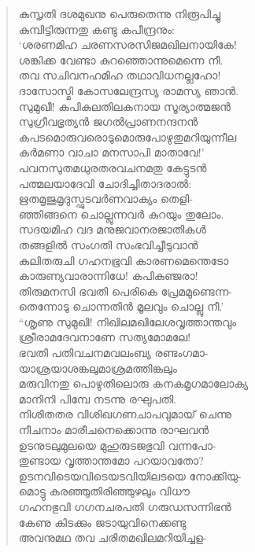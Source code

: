 \begin{verse}
കുസൃതി ദശമുഖനു പെരുതെന്നു നിരൂപിച്ചു\\
കുമ്പിട്ടിരുന്നതു കണ്ടു കപീന്ദ്രനും:\\
‘ശരണമിഹ ചരണസരസിജമഖിലനായികേ!\\
ശങ്കിക്ക വേണ്ടാ കുറഞ്ഞൊന്നുമെന്നെ നീ.\\
തവ സചിവനഹമിഹ തഥാവിധനല്ലഹോ!\\
ദാസോസ്മി കോസലേന്ദ്രസ്യ രാമസ്യ ഞാന്‍.\\
സുമുഖീ! കപികുലതിലകനായ സൂര്യാത്മജന്‍\\
സുഗ്രീവഭൃത്യന്‍ ജഗല്‍പ്രാണനന്ദനന്‍\\
കപടമൊരുവരൊടുമൊരുപോഴുതുമറിയുന്നീല\\
കര്‍മണാ വാചാ മനസാപി മാതാവേ!’\\
പവനസുതമധുരതരവചനമതു കേട്ടുടന്‍\\
പത്മലയാദേവി ചോദിച്ചിതാദരാല്‍:\\
ഋതമൃജുമൃദുസ്ഫുടവര്‍ണവാക്യം തെളി-\\
ഞ്ഞിങ്ങനെ ചൊല്ലുന്നവര്‍ കുറയും തുലോം.\\
സദയമിഹ വദ മനുജവാനരജാതികള്‍\\
തങ്ങളില്‍ സംഗതി സംഭവിച്ചീടുവാന്‍\\
കലിതരുചി ഗഹനഭൂവി കാരണമെന്തെടോ\\
കാരുണ്യവാരാന്നിധേ! കപികുഞ്ജരാ!\\
തിരുമനസി ഭവതി പെരികെ പ്രേമമുണ്ടെന്ന-\\
തെന്നോടു ചൊന്നതിന്‍ മൂലവും ചൊല്ലു നീ.’\\
“ശൃണു സുമുഖി! നിഖിലമഖിലേശവൃത്താന്തവും\\
ശ്രീരാമദേവനാണേ സത്യമോമലേ!\\
ഭവതി പതിവചനമവലംബ്യ രണ്ടംഗമാ-\\
യാശ്രയാശങ്കലുമാശ്രമത്തിങ്കലും\\
മരുവിനതു പൊഴുതിലൊരു കനകമൃഗമാലോക്യ\\
മാനിനി പിമ്പേ നടന്നു രഘുപതി.\\
നിശിതതര വിശിഖഗണചാപവുമായ് ചെന്നു\\
നീചനാം മാരീചനെക്കൊന്നു രാഘവന്‍\\
ഉടനുടലുമുലയെ മുഹുരുടജഭുവി വന്നപോ-\\
തുണ്ടായ വൃത്താന്തമോ പറയാവതോ?\\
ഉടനവിടെയവിടെയടവിയിലടയെ നോക്കിയു-\\
മൊട്ടു കരഞ്ഞുതിരിഞ്ഞുഴലും വിധൗ\\
ഗഹനഭുവി ഗഗനചരപതി ഗരുഡസന്നിഭന്‍\\
കേണു കിടക്കും ജടായുവിനെക്കണ്ടു\\
അവനുമഥ തവ ചരിതമഖിലമറിയിച്ചള-\\

\end{verse}
